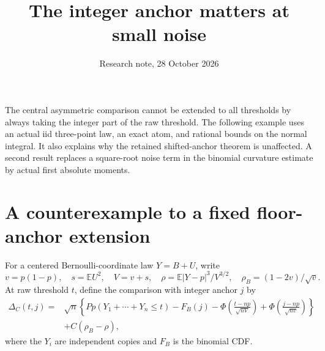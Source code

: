 \documentclass[11pt,a4paper]{article}
\title{The integer anchor matters at small noise}
\author{Research note, 28 October 2026}\date{}
\newcommand{\E}{\mathbb E}\newcommand{\Pp}{\mathbb P}
\begin{document}
\maketitle

The central asymmetric comparison cannot be extended to all thresholds by
always taking the integer part of the raw threshold. The following example
uses an actual iid three-point law, an exact atom, and rational bounds on the
normal integral. It also explains why the retained shifted-anchor theorem
is unaffected. A second result replaces a square-root noise term in the
binomial curvature estimate by actual first absolute moments.

\section{A counterexample to a fixed floor-anchor extension}
For a centered Bernoulli-coordinate law $Y=B+U$, write
\[
 v=p(1-p),\quad s=\E U^2,\quad V=v+s,\quad
 \rho=\E|Y-p|^3/V^{3/2},\quad \rho_B=(1-2v)/\sqrt v.
\]
At raw threshold $t$, define the comparison with integer anchor $j$ by
\begin{align*}
 \Delta_C(t,j)={}&\sqrt n\left\{Pp(Y_1+\cdots+Y_n\le t)-F_B(j)
 -\Phi\!\left(\frac{t-np}{\sqrt{nV}}\right)
 +\Phi\!\left(\frac{j-np}{\sqrt{nv}}\right)\right\}\\
 &+C(\rho_B-\rho),
\end{align*}
where the $Y_i$ are independent copies and $F_B$ is the binomial CDF.
\end{document}
